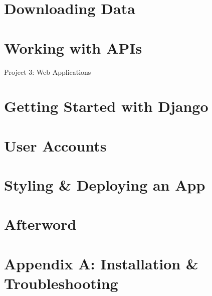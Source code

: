 \documentclass[oneside]{book}
\numberwithin{equation}{section}
\begin{document}

\section{Downloading Data}


\section{Working with APIs}


\begin{center}
	\Large Project 3: Web Applications
\end{center}

\section{Getting Started with Django}


\section{User Accounts}


\section{Styling \& Deploying an App}


\section*{Afterword}


\section{Appendix A: Installation \& Troubleshooting}
\end{document}
